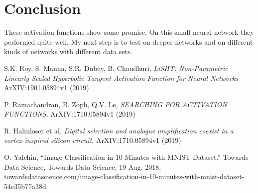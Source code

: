 \documentclass{amsart}
\theoremstyle{definition}
\theoremstyle{remark}
\numberwithin{equation}{section}
\begin{document}
\section{Conclusion}  

These activation functions show some promise. On this small neural network they performed quite well.  My next step is to test on deeper networks and on different kinds of networks with different data sets.


\begin{thebibliography}{10}

 S.K. Roy, S. Manna, S.R. Dubey, B. Chaudhuri, \textit{LiSHT: Non-Parametric Linearly Scaled Hyperbolic Tangent Activation Function for Neural Networks} ArXIV:1901.05894v1 (2019)

 P. Ramachandran, B. Zoph, Q.V. Le, \textit{SEARCHING FOR ACTIVATION FUNCTIONS}, ArXIV:1710.05894v1 (2019)

 R. Hahnloser et al, \textit{Digital selection and analogue amplification coexist in a cortex-inspired silicon circuit}, ArXIV:1710.05894v1 (2019)

 O. Yalchin, “Image Classification in 10 Minutes with MNIST Dataset.” Towards Data Science, Towards Data Science, 19 Aug. 2018, towardsdatascience.com/image-classification-in-10-minutes-with-mnist-dataset-54c35b77a38d

\end{thebibliography}
\end{document}
